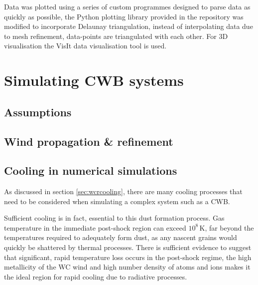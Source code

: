Data was plotted using a series of custom programmes designed to parse data as quickly as possible, 
the Python plotting library provided in the \athena{} repository was modified to incorporate Delaunay triangulation, instead of interpolating data due to mesh refinement, data-points are triangulated with each other.
For 3D visualisation the VisIt data visualisation tool is used.

\section{Simulating CWB systems}




\subsection{Assumptions}





\subsection{Wind propagation \& refinement}

\subsection{Cooling in numerical simulations}

As discussed in section \ref{sec:wcrcooling}, there are many cooling processes that need to be considered when simulating a complex system such as a CWB.

Sufficient cooling is in fact, essential to this dust formation process.
Gas temperature in the immediate post-shock region can exceed $10^8\, \si{\kelvin}$, far beyond the temperatures required to adequately form dust, as any nascent grains would quickly be shattered by thermal processes.
There is sufficient evidence to suggest that significant, rapid temperature loss occurs in the post-shock regime, the high metallicity of the WC wind and high number density of atoms and ions makes it the ideal region for rapid cooling due to radiative processes.

